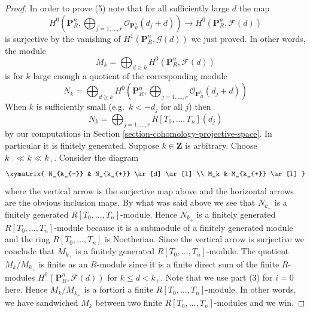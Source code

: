 \begin{proof}
\medskip\noindent
In order to prove (5) note that for all sufficiently large $d$
the map
$$
H^0(\mathbf{P}^n_R, \bigoplus\nolimits_{j = 1, \ldots, r}
\mathcal{O}_{\mathbf{P}^n_R}(d_j + d))
\to
H^0(\mathbf{P}^n_R, \mathcal{F}(d))
$$
is surjective by the vanishing of $H^1(\mathbf{P}^n_R, \mathcal{G}(d))$
we just proved. In other words, the module
$$
M_k
=
\bigoplus\nolimits_{d \geq k} H^0(\mathbf{P}^n_R, \mathcal{F}(d))
$$
is for $k$ large enough a quotient of the corresponding module
$$
N_k
=
\bigoplus\nolimits_{d \geq k} H^0(\mathbf{P}^n_R,
\bigoplus\nolimits_{j = 1, \ldots, r}
\mathcal{O}_{\mathbf{P}^n_R}(d_j + d)
)
$$
When $k$ is sufficiently small (e.g.\ $k < -d_j$ for all $j$) then
$$
N_k = \bigoplus\nolimits_{j = 1, \ldots, r}
R[T_0, \ldots, T_n](d_j)
$$
by our computations in Section \ref{section-cohomology-projective-space}.
In particular it is finitely generated.
Suppose $k \in \mathbf{Z}$ is arbitrary.
Choose $k_{-} \ll k \ll k_{+}$.
Consider the diagram
$$
\xymatrix{
N_{k_{-}} & N_{k_{+}} \ar[d] \ar[l] \\
M_k & M_{k_{+}} \ar[l]
}
$$
where the vertical arrow is the surjective map above and
the horizontal arrows are the obvious inclusion maps.
By what was said above we see that $N_{k_{-}}$ is a finitely
generated $R[T_0, \ldots, T_n]$-module. Hence $N_{k_{+}}$ is
a finitely generated $R[T_0, \ldots, T_n]$-module because it
is a submodule of a finitely generated module and the ring
$R[T_0, \ldots, T_n]$ is Noetherian. Since the vertical arrow
is surjective we conclude that $M_{k_{+}}$ is a finitely
generated $R[T_0, \ldots, T_n]$-module. The quotient
$M_k/M_{k_{+}}$ is finite as an $R$-module since it is a
finite direct sum of the finite $R$-modules
$H^0(\mathbf{P}^n_R, \mathcal{F}(d))$ for $k \leq d < k_{+}$.
Note that we use part (3) for $i = 0$ here. Hence
$M_k/M_{k_{+}}$ is a fortiori a finite $R[T_0, \ldots, T_n]$-module.
In other words, we have sandwiched $M_k$ between two finite
$R[T_0, \ldots, T_n]$-modules and we win.
\end{proof}